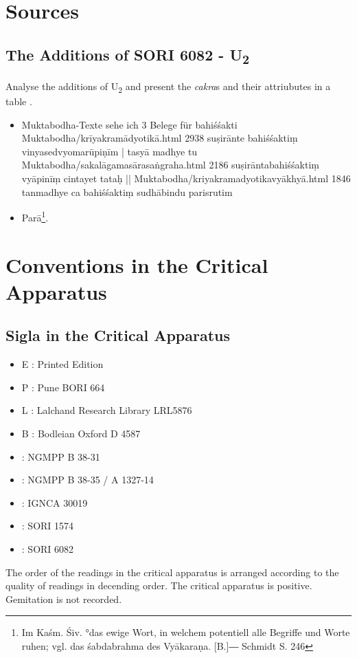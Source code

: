 \chapter{Sources}
\section{The Additions of  SORI 6082 - U\textsubscript{2}}
\label{discussionu2}
Analyse the additions of U\textsubscript{2} and present the \textit{cakra}s and their attriubutes in a table .
\begin{itemize}
\item  Muktabodha-Texte sehe ich 3 Belege für bahiśśakti Muktabodha/krīyakramādyotikā.html 2938 suṣirānte bahiśśaktiṃ vinyasedvyomarūpiṇīm | tasyā madhye tu Muktabodha/sakalāgamasārasaṅgraha.html 2186 suṣirāntabahiśśaktiṃ vyāpinīṃ cintayet tataḥ || Muktabodha/kriyakramadyotikavyākhyā.html 1846 tanmadhye ca bahiśśaktiṃ sudhābindu parisrutim
  \item  Parā\footnote{Im Kaśm. Śiv. °das ewige Wort, in welchem potentiell alle Begriffe und Worte ruhen; vgl. das śabdabrahma des Vyākaraṇa. [B.]― Schmidt S. 246}.
  \end{itemize}

\chapter{Conventions in the Critical Apparatus}
\section{Sigla in the Critical Apparatus}

\begin{itemize}
\item E : Printed Edition
\item P : Pune BORI 664
\item L : Lalchand Research Library LRL5876
\item B : Bodleian Oxford D 4587
\item \None : NGMPP B 38-31
\item \Ntwo : NGMPP B 38-35 / A 1327-14
\item \Done : IGNCA 30019
\item \Uone : SORI 1574
\item \Utwo: SORI 6082
\end{itemize}

The order of the readings in the critical apparatus is arranged according to the quality of readings in decending order. The critical apparatus is positive. Gemitation is not recorded. 


